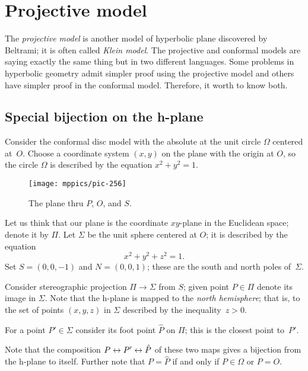 \chapter{Projective model}\label{chap:klein}

The {}\emph{projective model} is another model of hyperbolic plane discovered by Beltrami; it is often called {}\emph{Klein model}.
The projective and conformal models are saying exactly the same thing but in two different languages. 
Some problems in hyperbolic geometry admit simpler proof using the projective model and others have simpler proof in the conformal model.
Therefore, it worth to know both. 

\section*{Special bijection on the h-plane}

Consider the conformal disc model with the absolute at the unit circle $\Omega$ centered at~$O$.
Choose a coordinate system $(x,y)$ on the plane with the origin at $O$, 
so the circle $\Omega$ is described by the equation $x^2+y^2=1$.

{

\label{pic:stereographic_projection-klein}
\begin{wrapfigure}[17]{o}{48mm}
\centering
\texttt{[image: mppics/pic-256]}
\caption*{The plane thru $P$, $O$, and $S$.}
\end{wrapfigure}

Let us think that our plane is the coordinate $xy$-plane in the Euclidean space; denote it by $\Pi$.
Let $\Sigma$ be the unit sphere centered at $O$;
it is described by the equation 
$$x^2+y^2+z^2=1.$$
Set $S=(0,0,-1)$ and $N=(0,0,1)$; 
these are the south and north poles of~$\Sigma$.

Consider stereographic projection $\Pi\to\Sigma$ from $S$;
given point $P\in\Pi$ denote its image in $\Sigma$.
Note that the  h-plane is mapped to the {}\emph{north hemisphere};
that is, to the set of points $(x,y,z)$ in $\Sigma$ described by the inequality~$z>0$.

}

For a point $P'\in \Sigma$ consider its foot point $\hat P$
on $\Pi$;
this is the closest point to~$P'$.

Note that the composition $P\z\leftrightarrow P'\z\leftrightarrow\hat P$ of these two maps
gives a bijection from the h-plane to itself.
Further note that $P=\hat P$
 if and only if  $P\in \Omega$ or $P=O$.

